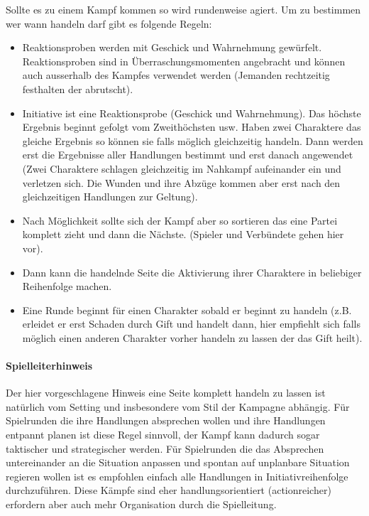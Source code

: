 \documentclass{article}
\begin{document}
Sollte es zu einem Kampf kommen so wird rundenweise agiert. Um zu bestimmen wer wann handeln darf gibt es folgende
Regeln:

\begin{itemize}
\item Reaktionsproben werden mit Geschick und Wahrnehmung gewürfelt. Reaktionsproben sind in Überraschungsmomenten angebracht und können auch ausserhalb des Kampfes verwendet werden (Jemanden rechtzeitig festhalten der abrutscht).
\item Initiative ist eine Reaktionsprobe (Geschick und Wahrnehmung). Das höchste Ergebnis beginnt gefolgt vom Zweithöchsten usw. Haben zwei Charaktere das gleiche Ergebnis so können sie falls möglich gleichzeitig handeln. Dann werden erst die Ergebnisse aller Handlungen bestimmt und erst danach angewendet (Zwei Charaktere schlagen gleichzeitig im Nahkampf aufeinander ein und verletzen sich. Die Wunden und ihre Abzüge kommen aber erst nach den gleichzeitigen Handlungen zur Geltung).
\item Nach Möglichkeit sollte sich der Kampf aber so sortieren das eine Partei komplett zieht und dann die Nächste. (Spieler und Verbündete gehen hier vor).
\item Dann kann die handelnde Seite die Aktivierung ihrer Charaktere in beliebiger Reihenfolge machen.
\item Eine Runde beginnt für einen Charakter sobald er beginnt zu handeln (z.B. erleidet er erst Schaden durch Gift und handelt dann, hier empfiehlt sich falls möglich einen anderen Charakter vorher handeln zu lassen der das Gift heilt).
\end{itemize}

\begin{mdframed}[hidealllines=true, backgroundcolor=black!10]
\paragraph{Spielleiterhinweis}

Der hier vorgeschlagene Hinweis eine Seite komplett handeln zu lassen ist natürlich vom Setting und insbesondere
vom Stil der Kampagne abhängig. Für Spielrunden die ihre Handlungen absprechen wollen und ihre Handlungen
entpannt planen ist diese Regel sinnvoll, der Kampf kann dadurch sogar taktischer und strategischer werden. Für
Spielrunden die das Absprechen untereinander an die Situation anpassen und spontan auf unplanbare Situation regieren
wollen ist es empfohlen einfach alle Handlungen in Initiativreihenfolge durchzuführen. Diese Kämpfe sind eher
handlungsorientiert (actionreicher) erfordern aber auch mehr Organisation durch die Spielleitung.

\end{mdframed}
\end{document}
